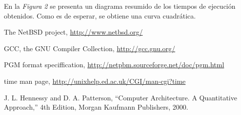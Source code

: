 \documentclass{article}
\begin{document}
	En la \textit{Figura 2} se presenta un diagrama resumido de los tiempos de ejecución obtenidos. Como es de esperar, se obtiene una curva cuadrática.


\newpage	




\begin{thebibliography}{99}

	 The NetBSD project, \url{http://www.netbsd.org/}

	 GCC, the GNU Compiler Collection, \url{http://gcc.gnu.org/}

	 PGM format speciffication, \url{http://netpbm.sourceforge.net/doc/pgm.html}

	 time man page, \url{http://unixhelp.ed.ac.uk/CGI/man-cgi?time}

	 J. L. Hennessy and D. A. Patterson, ``Computer Architecture. A Quantitative
	Approach,'' 4th Edition, Morgan Kaufmann Publishers, 2000.

	\end{thebibliography}

\newpage
\end{document}
